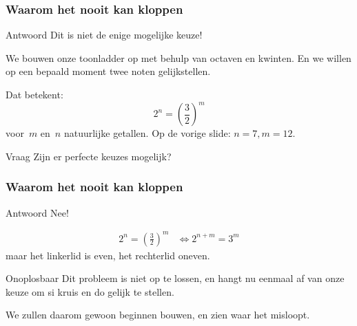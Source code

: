 \documentclass[compress, darktitle, framenumber, totalframenumber, handout]{beamer}
\begin{document}
\begin{frame}
  \frametitle{Waarom het nooit kan kloppen}

  \begin{block}{Antwoord}
    Dit is niet de enige mogelijke keuze!
  \end{block}
  We bouwen onze toonladder op met behulp van octaven en kwinten. En we willen op een bepaald moment twee noten gelijkstellen.

  \pause
  Dat betekent:
  \begin{equation}
    2^n=\left( \frac{3}{2} \right)^m
  \end{equation}
  voor~$m$ en~$n$ natuurlijke getallen. Op de vorige slide: $n=7,m=12$.
  \pause
  \begin{alertblock}{Vraag}
    Zijn er perfecte keuzes mogelijk?
  \end{alertblock}
\end{frame}

\begin{frame}
  \frametitle{Waarom het nooit kan kloppen}

  \begin{block}{Antwoord}
    Nee!
  \end{block}
  \pause
  \begin{equation}
    \begin{aligned}
      2^n=\left( \frac{3}{2} \right)^m&\Longleftrightarrow 2^{n+m}=3^m
    \end{aligned}
  \end{equation}
  maar het linkerlid is even, het rechterlid oneven.
  \pause
  \begin{block}{Onoplosbaar}
    Dit probleem is niet op te lossen, en hangt nu eenmaal af van onze keuze om si kruis en do gelijk te stellen.
  \end{block}
  We zullen daarom gewoon beginnen bouwen, en zien waar het misloopt.
\end{frame}
\end{document}
